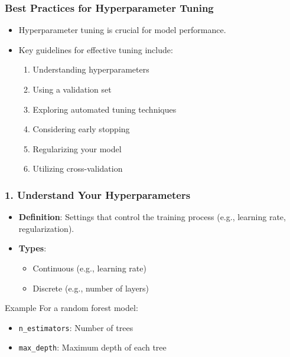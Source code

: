 \documentclass[aspectratio=169]{beamer}
\begin{document}
\begin{frame}
    \frametitle{Best Practices for Hyperparameter Tuning}
    \begin{itemize}
        \item Hyperparameter tuning is crucial for model performance.
        \item Key guidelines for effective tuning include:
        \begin{enumerate}
            \item Understanding hyperparameters
            \item Using a validation set
            \item Exploring automated tuning techniques
            \item Considering early stopping
            \item Regularizing your model
            \item Utilizing cross-validation
        \end{enumerate}
    \end{itemize}
\end{frame}

\begin{frame}
    \frametitle{1. Understand Your Hyperparameters}
    \begin{itemize}
        \item \textbf{Definition}: Settings that control the training process (e.g., learning rate, regularization).
        \item \textbf{Types}:
        \begin{itemize}
            \item Continuous (e.g., learning rate)
            \item Discrete (e.g., number of layers)
        \end{itemize}
    \end{itemize}
    \begin{block}{Example}
        For a random forest model:
        \begin{itemize}
            \item \texttt{n\_estimators}: Number of trees
            \item \texttt{max\_depth}: Maximum depth of each tree
        \end{itemize}
    \end{block}
\end{frame}
\end{document}
